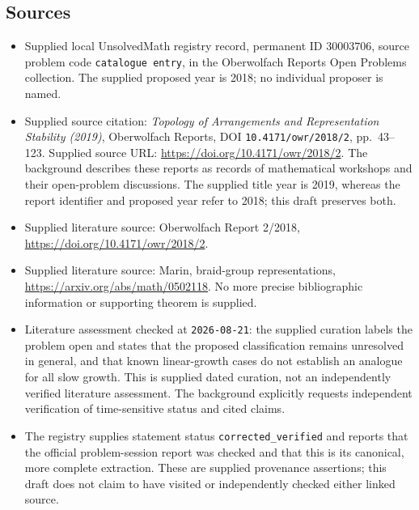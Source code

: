 \documentclass[11pt]{article}
\begin{document}
\subsection{Sources}
\begin{itemize}
\item Supplied local UnsolvedMath registry record, permanent ID \(30003706\), source problem code \texttt{catalogue entry}, in the Oberwolfach Reports Open Problems collection. The supplied proposed year is 2018; no individual proposer is named.
\item Supplied source citation: \emph{Topology of Arrangements and Representation Stability (2019)}, Oberwolfach Reports, DOI \texttt{10.4171/owr/2018/2}, pp.\ 43--123. Supplied source URL: \url{https://doi.org/10.4171/owr/2018/2}. The background describes these reports as records of mathematical workshops and their open-problem discussions. The supplied title year is 2019, whereas the report identifier and proposed year refer to 2018; this draft preserves both.
\item Supplied literature source: Oberwolfach Report 2/2018, \url{https://doi.org/10.4171/owr/2018/2}.
\item Supplied literature source: Marin, braid-group representations, \url{https://arxiv.org/abs/math/0502118}. No more precise bibliographic information or supporting theorem is supplied.
\item Literature assessment checked at \texttt{2026-08-21}: the supplied curation labels the problem open and states that the proposed classification remains unresolved in general, and that known linear-growth cases do not establish an analogue for all slow growth. This is supplied dated curation, not an independently verified literature assessment. The background explicitly requests independent verification of time-sensitive status and cited claims.
\item The registry supplies statement status \texttt{corrected\_verified} and reports that the official problem-session report was checked and that this is its canonical, more complete extraction. These are supplied provenance assertions; this draft does not claim to have visited or independently checked either linked source.
\end{itemize}
\end{document}
